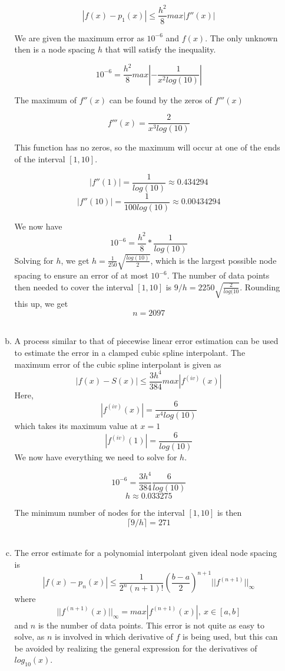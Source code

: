 \documentclass[11pt]{article}
\begin{document}
\begin{enumerate}
\begin{enumerate}[(a)]
				$$|f(x)-p_1(x)| \leq \frac{h^2}{8} max|f''(x)|$$

				We are given the maximum error as $10^{-6}$ and $f(x)$. The only unknown then is a node spacing $h$ that will
				satisfy the inequality.

				$$10^{-6} = \frac{h^2}{8}max|-\frac{1}{x^2log(10)}|$$

				The maximum of $f''(x)$ can be found by the zeros of $f'''(x)$

				$$f'''(x) = \frac{2}{x^3log(10)}$$

				This function has no zeros, so the maximum will occur at one of the ends of the interval $[1,10]$.

				$$|f''(1)| = \frac{1}{log(10)} \approx 0.434294$$
				$$|f''(10)| = \frac{1}{100log(10)} \approx 0.00434294$$

				We now have
				$$10^{-6} = \frac{h^2}{8}*\frac{1}{log(10)}$$
				Solving for $h$, we get $h = \frac{1}{250} \sqrt{\frac{log(10)}{2}}$, which is the largest possible node
				spacing to ensure an error of at most $10^{-6}$. The number of data points then needed to cover the interval
				$[1,10]$ is $9/h = 2250\sqrt{\frac{2}{log(10}}$. Rounding this up, we get
				$$n = 2097$$ \\

			\item A process similar to that of piecewise linear error estimation can be used to estimate the error in a clamped
				cubic spline interpolant. The maximum error of the cubic spline interpolant is given as
				$$|f(x)-S(x)| \leq \frac{3h^4}{384} max|f^{(iv)}(x)|$$
				Here,
				$$|f^{(iv)}(x)| = \frac{6}{x^4log(10)}$$
				which takes its maximum value at $x=1$
				$$|f^{(iv)}(1)| = \frac{6}{log(10)}$$
				We now have everything we need to solve for $h$.

				$$10^{-6} = \frac{3h^4}{384} \frac{6}{log(10)}$$
				$$h \approx 0.033275$$

				The minimum number of nodes for the interval $[1,10]$ is then
				$$\lceil 9/h \rceil = 271$$ \\

			\item The error estimate for a polynomial interpolant given ideal node spacing is
				$$|f(x)-p_n(x)| \leq \frac{1}{2^n(n+1)!} (\frac{b-a}{2})^{n+1}||f^{(n+1)}||_{\infty}$$
				where
				$$||f^{(n+1)}(x)||_{\infty} = max|f^{(n+1)}(x)|,\ x\in[a,b]$$
				and $n$ is the number of data points. This error is not quite as easy to solve, as $n$ is involved in which
				derivative of $f$ is being used, but this can be avoided by realizing the general expression for the
				derivatives of $log_{10}(x)$.


\end{enumerate}
\end{enumerate}
\end{document}
